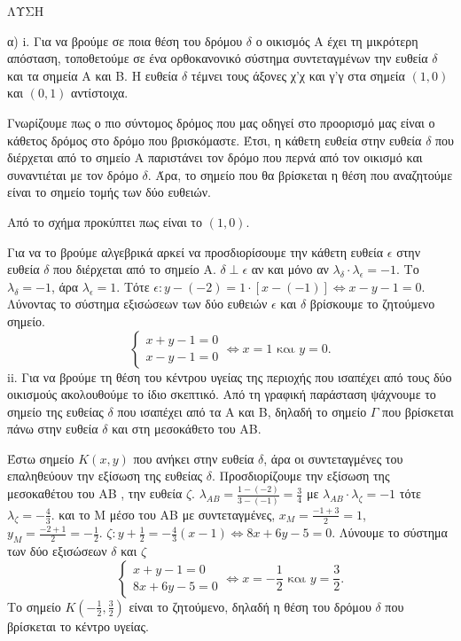 ΛΥΣΗ

α)
i. Για να βρούμε σε ποια θέση του δρόμου $\delta$ ο οικισμός Α έχει τη μικρότερη απόσταση, τοποθετούμε σε ένα ορθοκανονικό σύστημα συντεταγμένων την ευθεία $\delta$ και τα σημεία Α και Β. Η ευθεία $\delta$ τέμνει τους άξονες χ'χ και γ'γ στα σημεία $(1,0)$ και $(0,1)$ αντίστοιχα.

Γνωρίζουμε πως ο πιο σύντομος δρόμος που μας οδηγεί στο προορισμό μας είναι ο κάθετος δρόμος στο δρόμο που βρισκόμαστε. Έτσι, η κάθετη ευθεία στην ευθεία $\delta$ που διέρχεται από το σημείο Α παριστάνει τον δρόμο που περνά από τον οικισμό και συναντιέται με τον δρόμο $\delta$. Άρα, το σημείο που θα βρίσκεται η θέση που αναζητούμε είναι το σημείο τομής των δύο ευθειών.

Από το σχήμα προκύπτει πως είναι το $(1,0)$.

Για να το βρούμε αλγεβρικά αρκεί να προσδιορίσουμε την κάθετη ευθεία $\epsilon$ στην ευθεία $\delta$ που διέρχεται από το σημείο Α.
$\delta \perp \epsilon$ αν και μόνο αν $\lambda_\delta \cdot \lambda_\epsilon = -1$. Το $\lambda_\delta = -1$, άρα $\lambda_\epsilon = 1$.
Τότε $\epsilon: y - (-2) = 1 \cdot [x - (-1)] \Leftrightarrow x - y - 1 = 0$.
Λύνοντας το σύστημα εξισώσεων των δύο ευθειών $\epsilon$ και $\delta$ βρίσκουμε το ζητούμενο σημείο.
\[ \left\{ \begin{array}{l} x + y - 1 = 0 \\ x - y - 1 = 0 \end{array} \right. \Leftrightarrow x = 1 \text{ και } y = 0. \]
ii. Για να βρούμε τη θέση του κέντρου υγείας της περιοχής που ισαπέχει από τους δύο οικισμούς ακολουθούμε το ίδιο σκεπτικό. Από τη γραφική παράσταση ψάχνουμε το σημείο της ευθείας $\delta$ που ισαπέχει από τα Α και Β, δηλαδή το σημείο $\Gamma$ που βρίσκεται πάνω στην ευθεία $\delta$ και στη μεσοκάθετο του ΑΒ.

Έστω σημείο $K(x,y)$ που ανήκει στην ευθεία $\delta$, άρα οι συντεταγμένες του επαληθεύουν την εξίσωση της ευθείας $\delta$. Προσδιορίζουμε την εξίσωση της μεσοκαθέτου του ΑΒ , την ευθεία $\zeta$.
$\lambda_{AB} = \frac{1 - (-2)}{3 - (-1)} = \frac{3}{4}$ με $\lambda_{AB} \cdot \lambda_\zeta = -1$ τότε $\lambda_\zeta = -\frac{4}{3}$.
και το Μ μέσο του ΑΒ με συντεταγμένες, $x_M = \frac{-1 + 3}{2} = 1$, $y_M = \frac{-2 + 1}{2} = -\frac{1}{2}$.
$\zeta: y + \frac{1}{2} = -\frac{4}{3}(x - 1) \Leftrightarrow 8x + 6y - 5 = 0$.
Λύνουμε το σύστημα των δύο εξισώσεων $\delta$ και $\zeta$
\[ \left\{ \begin{array}{l} x + y - 1 = 0 \\ 8x + 6y - 5 = 0 \end{array} \right. \Leftrightarrow x = -\frac{1}{2} \text{ και } y = \frac{3}{2}. \]
Το σημείο $K(-\frac{1}{2}, \frac{3}{2})$ είναι το ζητούμενο, δηλαδή η θέση του δρόμου $\delta$ που βρίσκεται το κέντρο υγείας.

